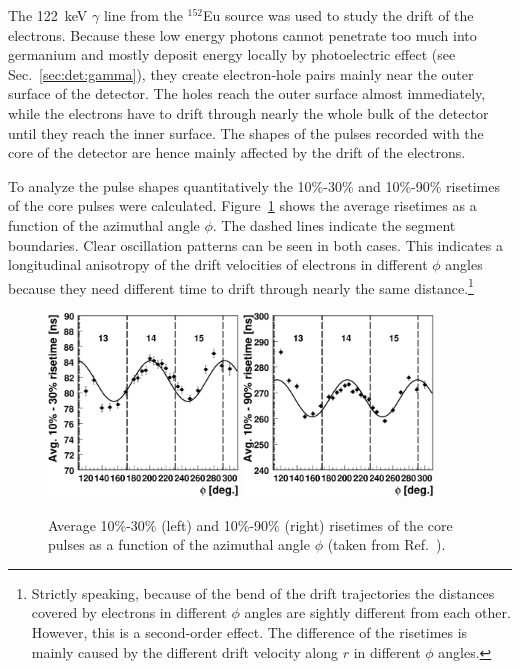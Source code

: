 The 122~keV $\gamma$ line from the $^{152}$Eu source was used to study the drift of the electrons. Because these low energy photons cannot penetrate too much into germanium and mostly deposit energy locally by photoelectric effect (see Sec.~\ref{sec:det:gamma}), they create electron-hole pairs mainly near the outer surface of the detector. The holes reach the outer surface almost immediately, while the electrons have to drift through nearly the whole bulk of the detector until they reach the inner surface. The shapes of the pulses recorded with the core of the detector are hence mainly affected by the drift of the electrons. 

To analyze the pulse shapes quantitatively the 10\%-30\% and 10\%-90\% risetimes of the core pulses were calculated. Figure~\ref{fig:psa:rt10} shows the average risetimes as a function of the azimuthal angle $\phi$. The dashed lines indicate the segment boundaries. Clear oscillation patterns can be seen in both cases. This indicates a longitudinal anisotropy of the drift velocities of electrons in different $\phi$ angles because they need different time to drift through nearly the same distance.\footnote{Strictly speaking, because of the bend of the drift trajectories the distances covered by electrons in different $\phi$ angles are sightly different from each other. However, this is a second-order effect. The difference of the risetimes is mainly caused by the different drift velocity along $r$ in different $\phi$ angles.}

\begin{figure}[htbp]
\centering
\includegraphics[width=0.45\textwidth]{phi_risetime1030}
\includegraphics[width=0.45\textwidth]{phi_risetime1090}
\caption{Average 10\%-30\% (left) and 10\%-90\% (right) risetimes of the core pulses as a function of the azimuthal angle $\phi$ (taken from Ref.~\cite{Sie07}).}
\label{fig:psa:rt10}
\end{figure}

